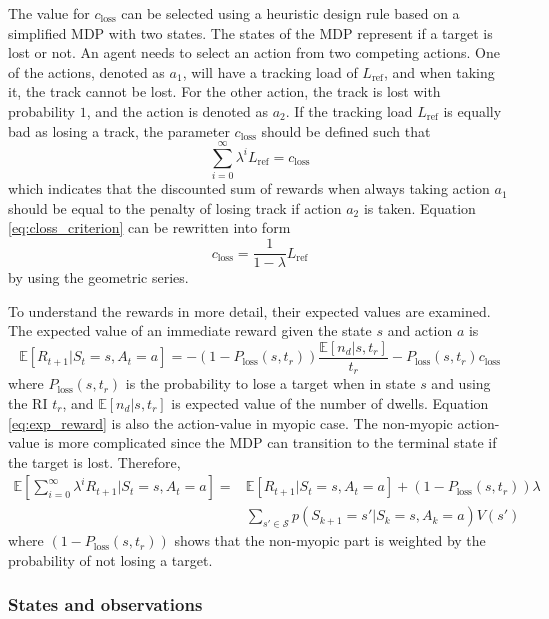 \documentclass[english, 12pt, a4paper, elec, utf8, a-1b, online]{aaltothesis}
\numberwithin{equation}{section}
\newcommand{\ploss}{P_\text{loss}}
\newcommand{\lref}{L_\text{ref}}
\newcommand{\Ss}{\mathcal{S}}
\newcommand{\E}[1]{\mathbb{E}\left[ #1 \right]}
\newcommand{\closs}{c_\text{loss}}
\newcommand{\ri}{t_r}
\begin{document}
The value for $\closs$ can be selected using a heuristic design rule based on a simplified MDP with two states.
The states of the MDP represent if a target is lost or not.
An agent needs to select an action from two competing actions.
One of the actions, denoted as $a_1$, will have a tracking load of $\lref$, and when taking it, the track cannot be lost.
For the other action, the track is lost with probability $1$, and the action is denoted as $a_2$.
If the tracking load $\lref$ is equally bad as losing a track, the parameter $\closs$ should be defined such that
\begin{equation}\label{eq:closs_criterion}
    \sum_{i=0}^\infty \lambda^i \lref = \closs
\end{equation}
which indicates that the discounted sum of rewards when always taking action $a_1$ should be equal to the penalty of losing track if action $a_2$ is taken.
Equation \eqref{eq:closs_criterion} can be rewritten into form
\begin{equation}
    \closs = \frac{1}{1-\lambda} \lref
\end{equation}
 by using the geometric series.

To understand the rewards in more detail, their expected values are examined.
The expected value of an immediate reward given the state $s$ and action $a$ is
\begin{equation}\label{eq:exp_reward}
    \E{R_{t+1} | S_t=s, A_t=a} = -(1-\ploss(s, \ri)) 
        \frac
        {
            \mathbb{E} \left[ n_d | s, \ri \right]
        }
        {
        \ri
        } 
        - \ploss(s, \ri) \closs
\end{equation}
where $\ploss(s, \ri)$ is the probability to lose a target when in state $s$ and using the RI $\ri$, and $\E{n_d|s, \ri}$ is expected value of the number of dwells.
Equation \eqref{eq:exp_reward} is also the action-value in myopic case.
The non-myopic action-value is more complicated since the MDP can transition to the terminal state if the target is lost.
Therefore, 
\begin{align}
    \E{\sum_{i=0}^\infty \lambda^i R_{t+1} | S_t=s, A_t=a} =& \E{R_{t+1} | S_t=s, A_t=a} + (1-\ploss(s, \ri)) \lambda \\
    & \sum_{s'\in \Ss} p(S_{k+1}=s'|S_{k}=s, A_{k}=a)  V(s')  
\end{align}
where $(1-\ploss(s, \ri))$ shows that the non-myopic part is weighted by the probability of not losing a target.

\subsubsection{States and observations} \label{sec:states}
\end{document}
